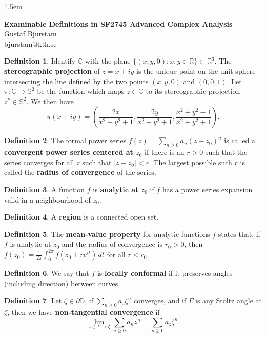 \documentclass[12pt]{article}
\theoremstyle{definition}
\newtheorem{definition}{Definition}
\newcommand{\D}{\mathbb{D}}      %
\newcommand{\real}{\mathbb{R}}   %
\newcommand{\C}{\mathbb{C}}    %
\begin{document}
\baselineskip 1.5em

\begin{center}
\textbf{\large Examinable Definitions in SF2745 Advanced Complex Analysis} \\
Gustaf Bjurstam\\
bjurstam@kth.se\\
\end{center}

\begin{definition}
    Identify $\C$ with the plane $\{(x,y,0):x,y\in\real\}\subset\real^3$. The \textbf{stereographic projection} of $z=x+iy$ is the unique point on the unit sphere intersecting the line defined by the two points $(x,y,0)$ and $(0,0,1)$. Let $\pi:\C\to\mathbb{S}^2$ be the function which maps $z\in\C$ to its stereographic projection $z^*\in\mathbb{S}^2$. We then have
    \begin{equation*}
        \pi(x+iy)=\left(\frac{2x}{x^2+y^2+1},\frac{2y}{x^2+y^2+1},\frac{x^2+y^2-1}{x^2+y^2+1}\right).
    \end{equation*}
\end{definition}
\begin{definition}
    The formal power series $f(z)=\sum_{n\geq0} a_n(z-z_0)^n$ is called a \textbf{convergent power series centered at $z_0$} if there is an $r>0$ such that the series converges for all $z$ such that $|z-z_0|<r$. The largest possible such $r$ is called the \textbf{radius of convergence} of the series.
\end{definition}
\begin{definition}
    A function $f$ is \textbf{analytic at $z_0$} if $f$ has a power series expansion valid in a neighbourhood of $z_0$.
\end{definition}
\begin{definition}
    A \textbf{region} is a connected open set.
\end{definition} 
\begin{definition}
    The \textbf{mean-value property} for analytic functions $f$ states that, if $f$ is analytic at $z_0$ and the radius of convergence is $r_0>0$, then $f(z_0)=\frac{1}{2\pi}\int_0^{2\pi}f(z_0+re^{it})\,dt$ for all $r<r_0$.
\end{definition} 
\begin{definition}
    We say that $f$ is \textbf{locally conformal} if it preserves angles (including direction) between curves.
\end{definition} 
\begin{definition}
    Let $\zeta\in\partial \D$, if $\sum_{n\geq0}a_z\zeta^n$ converges, and if $\Gamma$ is any Stoltz angle at $\zeta$, then we have \textbf{non-tangential convergence} if
    \begin{equation*}
        \lim_{z\in\Gamma\to\zeta} \sum_{n\geq 0} a_nz^n=\sum_{n\geq0}a_z\zeta^n.
    \end{equation*}
\end{definition} 
\end{document}
